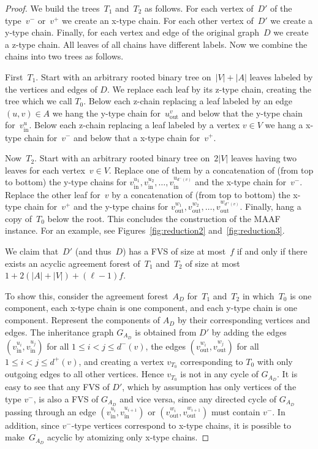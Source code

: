 \begin{proof}
We build the trees~$T_1$ and~$T_2$ as follows. For each vertex of~$D'$ of the type~$v^-$ or~$v^+$ we create an x-type chain. For each other vertex of~$D'$ we create a y-type chain. Finally, for each vertex and edge of the original graph~$D$ we create a z-type chain. All leaves of all chains have different labels. Now we combine the chains into two trees as follows.

First~$T_1$. Start with an arbitrary rooted binary tree on~$|V|+|A|$ leaves labeled by the vertices and edges of $D$. We replace each leaf by its z-type chain, creating the tree which we call $T_0$. Below each z-chain replacing a leaf labeled by an edge $(u,v)\in A$ we hang the y-type chain for~$u_\text{out}^v$ and below that the y-type chain for~$v_\text{in}^u$. Below each z-chain replacing a leaf labeled by a vertex $v\in V$ we hang a x-type chain for~$v^-$ and below that a x-type chain for~$v^+$. 

Now~$T_2$. Start with an arbitrary rooted binary tree on~$2|V|$ leaves having two leaves for each vertex~$v\in V$. Replace one of them by a concatenation of (from top to bottom) the y-type chains for $v_{\text{in}}^{u_1},v_{\text{in}}^{u_2},\ldots,v_{\text{in}}^{u_{d^-(v)}}$ and the x-type chain for~$v^-$. Replace the other leaf for~$v$ by a concatenation of (from top to bottom) the x-type chain for~$v^+$ and the y-type chains for $v_{\text{out}}^{w_1},v_{\text{out}}^{w_2},\ldots,v_{\text{out}}^{w_{d^+(v)}}$. Finally, hang a copy of~$T_0$ below the root. This concludes the construction of the MAAF instance. For an example, see Figures~\ref{fig:reduction2} and~\ref{fig:reduction3}.

We claim that~$D'$ (and thus~$D$) has a FVS of size at most~$f$ if and only if there exists an acyclic agreement forest of~$T_1$ and~$T_2$ of size at most $1+2(|A|+|V|)+(\ell-1)f$.

To show this, consider the agreement forest~$A_D$ for~$T_1$ and~$T_2$ in which~$T_0$ is one component, each x-type chain is one component, and each y-type chain is one component. Represent the components of $A_D$ by their corresponding vertices and edges. The inheritance graph $G_{A_D}$ is obtained from $D'$ by adding the edges $(v_{\text{in}}^{u_i},v_{\text{in}}^{u_j})$ for all $1\leq i< j\leq d^-(v)$,  the edges $(v_{\text{out}}^{w_i},v_{\text{out}}^{w_j})$ for all $1\leq i< j\leq d^+(v)$, and creating a vertex $v_{T_0}$ corresponding to $T_0$ with only outgoing edges to all other vertices. Hence $v_{T_0}$ is not in any cycle of $G_{A_D}$.
It is easy to see that any FVS of $D'$, which by assumption has only vertices of the type $v^-$, is also a FVS of $G_{A_D}$ and vice versa, since any directed cycle of $G_{A_D}$ passing through an edge $(v_{\text{in}}^{u_i},v_{\text{in}}^{u_{i+1}})$ or $(v_{\text{out}}^{w_i},v_{\text{out}}^{w_{i+1}})$
must contain $v^-$. In addition, since $v^-$-type vertices correspond to x-type chains, it is possible to make~$G_{A_D}$ acyclic by atomizing only x-type chains.


\end{proof}
